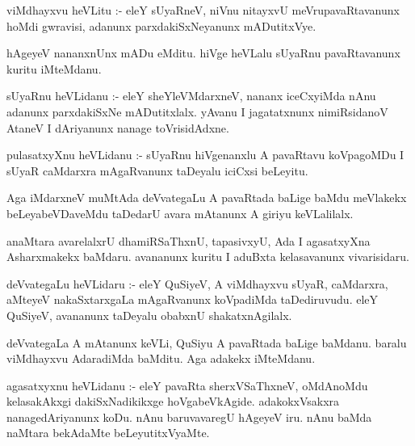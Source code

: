 \documentclass{article}
\begin{document}
\begin{mn}
viMdhayxvu  heVLitu :- eleY  sUyaRneV,  niVnu  nitayxvU  meVrupavaRtavanunx  hoMdi  
gwravisi,  adanunx  parxdakiSxNeyanunx  mADutitxVye.
\end{mn}

\begin{mn}
hAgeyeV  nananxnUnx  mADu  eMditu.  hiVge  heVLalu  sUyaRnu  pavaRtavanunx  kuritu  iMteMdanu.
\end{mn}

\begin{mn}
sUyaRnu  heVLidanu :- eleY  sheYleVMdarxneV,  nananx  iceCxyiMda  nAnu  adanunx  
parxdakiSxNe mADutitxlalx.  yAvanu  I  jagatatxnunx  nimiRsidanoV  AtaneV  
I  dAriyanunx  nanage  toVrisidAdxne.
\end{mn}

\begin{mn}
pulasatxyXnu  heVLidanu :- sUyaRnu  hiVgenanxlu  A  pavaRtavu  koVpagoMDu  
I  sUyaR caMdarxra mAgaRvanunx  taDeyalu  iciCxsi  beLeyitu.
\end{mn}

\begin{mn}
Aga  iMdarxneV  muMtAda  deVvategaLu  A  pavaRtada  baLige  baMdu  meVlakekx  
beLeyabeVDaveMdu  taDedarU  avara  mAtanunx  A  giriyu  keVLalilalx.
\end{mn}

\begin{mn}
anaMtara  avarelalxrU  dhamiRSaThxnU,  tapasivxyU,  Ada  I  agasatxyXna  
Asharxmakekx  baMdaru.  avananunx  kuritu  I  aduBxta  kelasavanunx  vivarisidaru.
\end{mn}

\begin{mn}
deVvategaLu  heVLidaru :- eleY  QuSiyeV,  A  viMdhayxvu  sUyaR,  caMdarxra,  
aMteyeV nakaSxtarxgaLa  mAgaRvanunx  koVpadiMda  taDediruvudu.  eleY  
QuSiyeV,  avananunx  taDeyalu  obabxnU  shakatxnAgilalx.
\end{mn}

\begin{mn}
deVvategaLa  A  mAtanunx  keVLi,  QuSiyu  A  pavaRtada  baLige  baMdanu.  
baralu  viMdhayxvu  AdaradiMda  baMditu.  Aga  adakekx  iMteMdanu.
\end{mn}

\begin{mn}
agasatxyxnu  heVLidanu :- eleY  pavaRta  sherxVSaThxneV,  oMdAnoMdu  kelasakAkxgi  
dakiSxNadikikxge  hoVgabeVkAgide.  adakokxVsakxra  nanagedAriyanunx  koDu.  nAnu  
baruvavaregU  hAgeyeV  iru.  nAnu  baMda  naMtara  bekAdaMte  beLeyutitxVyaMte.
\end{mn}
\end{document}
